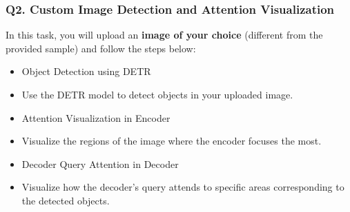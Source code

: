 \documentclass[11pt]{article}
\begin{document}
    \subsubsection*{\texorpdfstring{\textbf{Q2. Custom Image Detection and
Attention
Visualization}}{Q2. Custom Image Detection and Attention Visualization}}\label{q2.-custom-image-detection-and-attention-visualization}

In this task, you will upload an \textbf{image of your choice}
(different from the provided sample) and follow the steps below:

\begin{itemize}
\item
  Object Detection using DETR
\item
  Use the DETR model to detect objects in your uploaded image.
\item
  Attention Visualization in Encoder
\item
  Visualize the regions of the image where the encoder focuses the most.
\item
  Decoder Query Attention in Decoder
\item
  Visualize how the decoder's query attends to specific areas
  corresponding to the detected objects.
\end{itemize}
\end{document}
